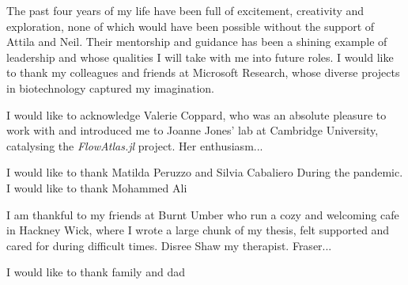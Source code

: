 \begin{acknowledgements}
    The past four years of my life have been full of excitement, creativity and exploration, none of which would have been possible without the support of Attila and Neil. Their mentorship and guidance has been a shining example of leadership and whose qualities I will take with me into future roles. I would like to thank my colleagues and friends at Microsoft Research, whose diverse projects in biotechnology captured my imagination.

    I would like to acknowledge Valerie Coppard, who was an absolute pleasure to work with and introduced me to Joanne Jones' lab at Cambridge University, catalysing the \emph{FlowAtlas.jl} project. Her enthusiasm...

    I would like to thank Matilda Peruzzo and Silvia Cabaliero During the pandemic. I would like to thank Mohammed Ali

    I am thankful to my friends at Burnt Umber who run a cozy and welcoming cafe in Hackney Wick, where I wrote a large chunk of my thesis, felt supported and cared for during difficult times. Disree Shaw my therapist. Fraser...

    I would like to thank family and dad
\end{acknowledgements}


\setcounter{tocdepth}{2} 

\tableofcontents
\listoffigures